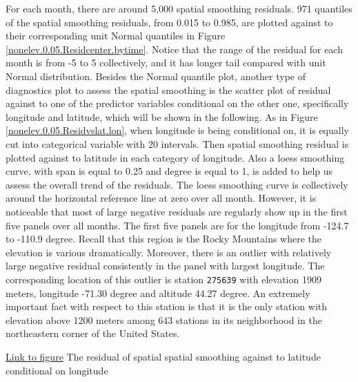 For each month, there are around 5,000 spatial smoothing residuals. 971 quantiles 
of the spatial smoothing residuals, from 0.015 to 0.985, are plotted against to 
their corresponding unit Normal quantiles in Figure 
\href{../plots/a1950/spaimpute/nonelev/span0.05/a1950.spaResidcenter.bytime.pdf}
{\ref*{nonelev.0.05.Residcenter.bytime}}. Notice that the range of the residual
for each month is from -5 to 5 collectively, and it has longer tail compared with
unit Normal distribution. Besides the Normal quantile plot, another type of 
diagnostics plot to assess the spatial smoothing is the scatter plot of residual 
against to one of the predictor variables conditional on the other one, 
specifically longitude and latitude, which will be shown in the following. As in 
Figure
\href{../plots/a1950/spaimpute/nonelev/span0.05/a1950.spaResid.vs.lat.lon.pdf}
{\ref*{nonelev.0.05.Residvslat.lon}}, when longitude is being conditional on, it
is equally cut into categorical variable with 20 intervals. Then spatial smoothing 
residual is plotted against to latitude in each category of longitude. Also a 
loess smoothing curve, with span is equal to 0.25 and degree is equal to 1, is 
added to help us assess the overall trend of the residuals. The loess smoothing 
curve is collectively around the horizontal reference line at zero over all month. 
However, it is noticeable that most of large negative residuals are
regularly show up in the first five panels over all months. The first five panels
are for the longitude from -124.7 to -110.9 degree. Recall that this region is
the Rocky Mountains where the elevation is various dramatically.
Moreover, there is an outlier with relatively large negative residual consistently 
in the panel with largest longitude. The corresponding location of this outlier
is station \texttt{275639} with elevation 1909 meters, longitude -71.30 degree
and altitude 44.27 degree. An extremely important fact with respect to this
station is that it is the only station with elevation above 1200 meters among
643 stations in its neighborhood in the northeastern corner of the United States. 

\begin{framed}
\begin{center}
  \href{../plots/a1950/spaimpute/nonelev/span0.05/a1950.spaResid.vs.lat.lon.pdf}
  {Link to figure}
  {The residual of spatial spatial smoothing against to latitude conditional on 
  longitude}
  \label{nonelev.0.05.Residvslat.lon}
\end{center}
\end{framed}

